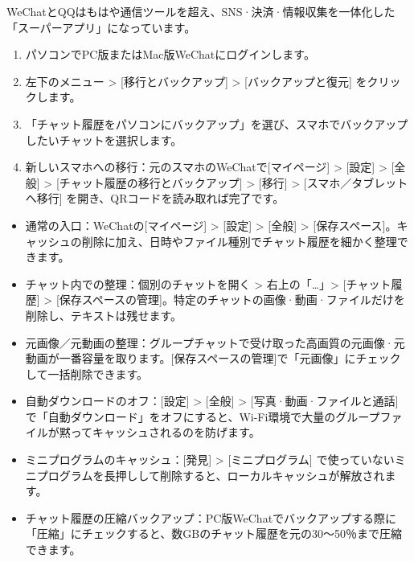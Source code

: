 WeChatとQQはもはや通信ツールを超え、SNS·決済·情報収集を一体化した「スーパーアプリ」になっています。


\begin{enumerate}
  \item パソコンでPC版またはMac版WeChatにログインします。
  \item 左下のメニュー > [移行とバックアップ] > [バックアップと復元] をクリックします。
  \item 「チャット履歴をパソコンにバックアップ」を選び、スマホでバックアップしたいチャットを選択します。
  \item 新しいスマホへの移行：元のスマホのWeChatで[マイページ] > [設定] > [全般] > [チャット履歴の移行とバックアップ] > [移行] > [スマホ／タブレットへ移行] を開き、QRコードを読み取れば完了です。
\end{enumerate}


\begin{itemize}
  \item 通常の入口：WeChatの[マイページ] > [設定] > [全般] > [保存スペース]。キャッシュの削除に加え、日時やファイル種別でチャット履歴を細かく整理できます。
  \item チャット内での整理：個別のチャットを開く > 右上の「…」> [チャット履歴] > [保存スペースの管理]。特定のチャットの画像·動画·ファイルだけを削除し、テキストは残せます。
  \item 元画像／元動画の整理：グループチャットで受け取った高画質の元画像·元動画が一番容量を取ります。[保存スペースの管理]で「元画像」にチェックして一括削除できます。
  \item 自動ダウンロードのオフ：[設定] > [全般] > [写真·動画·ファイルと通話] で「自動ダウンロード」をオフにすると、Wi-Fi環境で大量のグループファイルが黙ってキャッシュされるのを防げます。
  \item ミニプログラムのキャッシュ：[発見] > [ミニプログラム] で使っていないミニプログラムを長押しして削除すると、ローカルキャッシュが解放されます。
  \item チャット履歴の圧縮バックアップ：PC版WeChatでバックアップする際に「圧縮」にチェックすると、数GBのチャット履歴を元の30〜50％まで圧縮できます。
\end{itemize}


